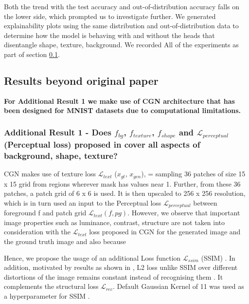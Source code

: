 Both the trend with the test accuracy and out-of-distribution accuracy falls on the lower side, which prompted us to investigate further. We generated explainability plots using the same distribution and out-of-distribution data to determine how the model is behaving with and without the heads that disentangle shape, texture, background. We recorded All of the experiments as part of section \ref{section:resultsbeyondpaper}.

\subsection{Results beyond original paper}
\label{section:resultsbeyondpaper}
\textbf{For Additional Result 1 we make use of CGN\cite{sauer2021counterfactual} architecture that has been designed for MNIST datasets due to computational limitations.}
\subsubsection{Additional Result 1 - Does  $f_{bg}$, $f_{texture}$, $f_{shape}$ and $\mathcal{L}_{perceptual}$ (Perceptual loss) proposed in \cite{sauer2021counterfactual} cover all aspects of background, shape, texture? }

CGN \cite{sauer2021counterfactual} makes use of texture loss $\mathcal{L}_{text}$ ($x_{gt}$, $x_{gen}$), = sampling 36 patches of size 15 x 15 grid from regions wherever mask has values near 1. Further, from these 36 patches, a patch grid of 6 x 6 is used. It is then upscaled to 256 x 256 resolution, which is in turn used an input to the Perceptual loss $\mathcal{L}_{perceptual}$ between foreground f and patch grid $\mathcal{L}_{text} (f, pg)$. 
However, we observe that important image properties such as luminance, contrast, structure are not taken into consideration with the $\mathcal{L}_{text}$ loss proposed in CGN \cite{sauer2021counterfactual} for the generated image and the ground truth image and also because 

Hence, we propose the usage of an additional Loss function $\mathcal{L}_{ssim}$ (SSIM) \cite{wang2004image}. In addition, motivated by results as shown in \cite{zhao2016loss}, \cite{pandey2020unsupervised} L2 loss unlike SSIM \cite{wang2004image} over different distortions of the image remains constant instead of recognising them . It complements the structural loss $\mathcal{L}_{rec}$. 
Default Gaussian Kernel of 11 was used as a hyperparameter for SSIM \cite{wang2004image}.


